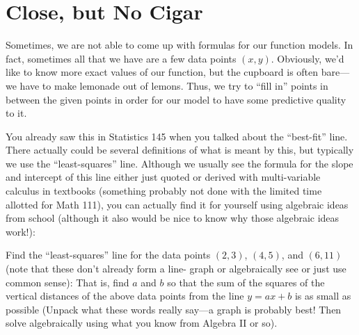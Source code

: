 \newpage
\section{Close, but No Cigar}

Sometimes, we are not able to come up with formulas for our function
models.  In fact, sometimes all that we have are a few data points $(x,
y)$.  Obviously, we'd like to know more exact values of our function,
but the cupboard is often bare---we have to make lemonade out of
lemons.  Thus, we try to ``fill in'' points in between the given points
in order for our model to have some predictive quality to it.

You already saw this in Statistics 145 when you talked about the
``best-fit'' line.  There actually could be several definitions of what
is meant by this, but typically we use the ``least-squares'' line.
Although we usually see the formula for the slope and intercept of
this line either just quoted or derived with multi-variable calculus
in textbooks (something probably not done with the limited time
allotted for Math 111), you can actually find it for yourself using
algebraic ideas from school (although it also would be nice to know
why those algebraic ideas work!):

\begin{prob}
Find the ``least-squares'' line for the data points $(2, 3)$, $(4,
5)$, and $(6, 11)$ (note that these don't already form a line- graph
or algebraically see or just use common sense): That is, find $a$ and
$b$ so that the sum of the squares of the vertical distances of the
above data points from the line $y=ax+b$ is as small as possible
(Unpack what these words really say---a graph is probably best!  Then
solve algebraically using what you know from Algebra II or so).
\end{prob}

